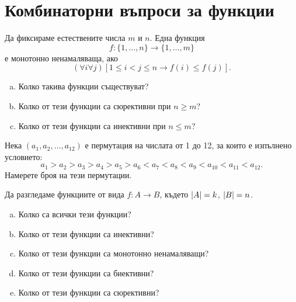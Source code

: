 \section*{Комбинаторни въпроси за функции}

\begin{problem}
  Да фиксираме естествените числа $m$ и $n$.
  Една функция \[f:\{1,\dots,n\}\to\{1,\dots,m\}\] е монотонно ненамаляваща, ако
  \[(\forall i\forall j)[1\leq i<j\leq n \rightarrow f(i)\leq f(j)].\]
  \begin{enumerate}[a)]
  \item
    Колко такива функции съществуват?
  \item
    Колко от тези функции са сюрективни при $n\geq m$?
  \item
    Колко от тези функции са инективни при $n\leq m$?
\end{enumerate}
\end{problem}


\begin{problem}
  Нека $(a_1,a_2,\dots,a_{12})$ е пермутация на числата от 1 до 12, за които е изпълнено условието:
  \[a_1 > a_2 > a_3 > a_4 > a_5 > a_6 < a_7 < a_8 < a_9 < a_{10} < a_{11} < a_{12}.\]
  Намерете броя на тези пермутации.  
\end{problem}

\begin{problem}
  Да разгледаме функциите от вида $f:A\to B$,
  където $\lvert{A}\rvert = k$, $\lvert{B}\rvert = n$.
  \begin{enumerate}[a)]
  \item 
    Колко са всички тези функции?
  \item
    Колко от тези функции са инективни?
  \item
    Колко от тези функции са монотонно ненамаляващи?
  \item
    Колко от тези функции са биективни?
  \item
    Колко от тези функции са сюрективни?
  \end{enumerate}
\end{problem}

